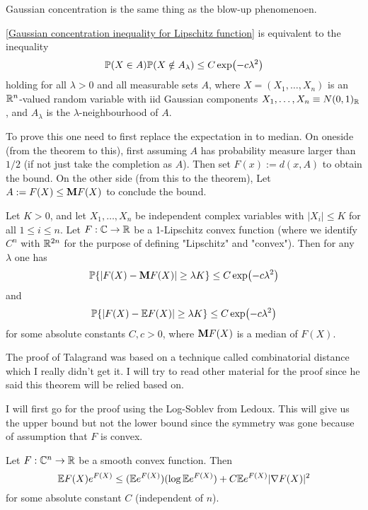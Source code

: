 Gaussian concentration is the same thing as the blow-up phenomenoen.

\ref{Gaussian concentration inequality for Lipschitz function} is equivalent to the inequality 
\begin{equation*}
    \mathbb{P}(X\in A) \mathbb{P}(X\notin A_\lambda) \leq C \exp(-c\lambda^2)
\end{equation*}
holding for all $\lambda>0$ and all measurable sets $A$, where $X=(X_1,\dots,X_n)$ is an $\mathbb{R}^n$-valued random variable with iid Gaussian components $X_1,\dots,X_n \equiv N(0,1)_{\mathbb{R}}$, and $A_\lambda$ is the $\lambda$-neighbourhood of $A$. 

To prove this one need to first replace the expectation in to median. 
On oneside (from the theorem to this), first assuming $A$ has probability measure larger than $1/2$ (if not just take the completion as $A$). Then set $F(x) := d(x,A)$ to obtain the bound. 
On the other side (from this to the theorem), Let $A:=F(X) \leq \mathbf{M} F(X)$ to conclude the bound.

\begin{theorem}
    \label{Talagrand concentration inequality}
    Let $K>0$, and let $X_1,\dots,X_n$ be independent complex variables with $|X_i| \leq K$ for all $1\leq i \leq n$. 
    Let $F:\mathbb C\to \mathbb{R}$ be a 1-Lipschitz convex function (where we identify $C^n$ with $\mathbb{R}^{2n}$ for the purpose of defining "Lipschitz" and "convex"). Then for any $\lambda$ one has
    \begin{equation*}
        \mathbb{P}\{|F(X)-\mathbf{M} F(X)|\geq \lambda K \} \leq C\exp (-c \lambda^2)
    \end{equation*}
    and
    \begin{equation*}
        \mathbb{P}\{|F(X)-\mathbb{E} F(X)|\geq \lambda K \} \leq C\exp (-c \lambda^2)
    \end{equation*}
    for some absolute constants $C,c>0$, where $\mathbf{M} F(X)$ is a median of $F(X)$.
\end{theorem}

The proof of Talagrand was based on a technique called combinatorial distance which I really didn't get it. I will try to read other material for the proof since he said this theorem will be relied based on.

I will first go for the proof using the Log-Soblev from Ledoux. This will give us the upper bound but not the lower bound since the symmetry was gone because of assumption that $F$ is convex. 

\begin{theorem}
    \label{log-sobolev inequality}
    Let $F:\mathbb C^n \to \mathbb{R}$ be a smooth convex function. Then
    \begin{equation*}
        \mathbb{E} F(X) e^{F(X)} \leq (\mathbb{E} e^{F(X)})(\log \mathbb{E} e^{F(X)})+C \mathbb{E} e^{F(X)} |\nabla F(X)|^2
    \end{equation*}
    for some absolute constant $C$ (independent of $n$).
\end{theorem}

